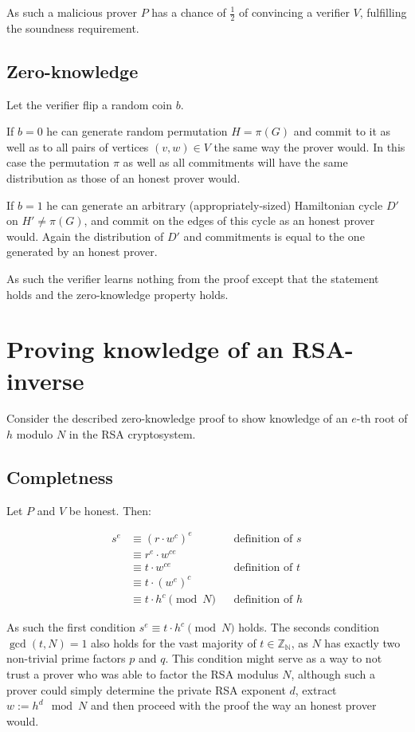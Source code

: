 \documentclass[a4paper]{scrreprt}
\begin{document}
As such a malicious prover $P$ has a chance of $\frac{1}{2}$ of convincing a
verifier $V$, fulfilling the soundness requirement.

\subsection{Zero-knowledge}

Let the verifier flip a random coin $b$.

If $b = 0$ he can generate random permutation $H = \pi(G)$ and commit to it as
well as to all pairs of vertices $(v, w) \in V$ the same way the prover would.
In this case the permutation $\pi$ as well as all commitments will have the same
distribution as those of an honest prover would.

If $b = 1$ he can generate an arbitrary (appropriately-sized) Hamiltonian
cycle $D'$ on $H' \neq \pi(G)$, and commit on the edges of this cycle as an
honest prover would. Again the distribution of $D'$ and commitments is equal to
the one generated by an honest prover.

As such the verifier learns nothing from the proof except that the statement
holds and the zero-knowledge property holds.

\section{Proving knowledge of an RSA-inverse}

Consider the described zero-knowledge proof to show knowledge of an $e$-th root
of $h$ modulo $N$ in the RSA cryptosystem.

\subsection{Completness}

Let $P$ and $V$ be honest. Then:

\begin{align*}
		s^e & \equiv (r \cdot w^c)^e && \text{definition of $s$} \\
			& \equiv r^e \cdot w^{ce} \\
			& \equiv t \cdot w^{ce} && \text{definition of $t$} \\
			& \equiv t \cdot (w^{e})^{c} \\
			& \equiv t \cdot h^{c} \pmod{N} && \text{definition of $h$}
\end{align*}

As such the first condition $s^e \equiv t \cdot h^c \pmod{N}$ holds. The
seconds condition $\operatorname{gcd}(t, N) = 1$ also holds for the vast
majority of $t \in \mathbb{Z_N}$, as $N$ has exactly two non-trivial prime
factors $p$ and $q$. This condition might serve as a way to not trust a prover
who was able to factor the RSA modulus $N$, although such a prover could simply
determine the private RSA exponent $d$, extract $w := h^d \mod N$ and then
proceed with the proof the way an honest prover would.
\end{document}
